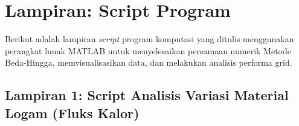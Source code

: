\documentclass[12pt,a4paper]{article}
\begin{document}
\renewcommand{\refname}{Daftar Pustaka} 
 
 

\newpage
\section{Lampiran: Script Program}

Berikut adalah lampiran \textit{script} program komputasi yang ditulis menggunakan perangkat lunak MATLAB untuk menyelesaikan persamaan numerik Metode Beda-Hingga, memvisualisasikan data, dan melakukan analisis performa grid.

\subsection*{Lampiran 1: Script Analisis Variasi Material Logam (Fluks Kalor)}
\end{document}
